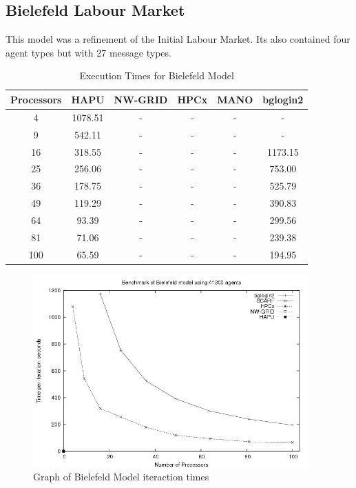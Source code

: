 \subsection{Bielefeld Labour Market}
This model was a refinement of the Initial Labour Market. Its also contained four agent types but with 27 message types.
{
\renewcommand{\arraystretch}{1.25}
\begin{table}[ht]
 \centering
  \begin{tabular}{c|ccccc}
 Processors &HAPU  &NW-GRID &HPCx  &MANO   &bglogin2 \\ \hline
 4   &1078.51  &-   &-   &-   &-   \\
 9   &542.11   &-   &-   &-   &-   \\
 16   &318.55   &-   &-   &-   &1173.15  \\
 25   &256.06   &-   &-   &-   &753.00   \\
 36   &178.75   &-   &-   &-   &525.79   \\
 49   &119.29   &-   &-   &-   &390.83   \\
 64   &93.39  &-   &-   &-   &299.56   \\
 81   &71.06   &-   &-   &-   &239.38   \\
 100   &65.59   &-   &-   &-   &194.95   \\
 \end{tabular}
 \caption{Execution Times for Bielefeld Model}
 \label{tab:ExecutionTimesForBielefeld}
\end{table}
}
\bigskip
\begin{figure}[ht]
 \centering
  \includegraphics[width=300pt]{Bielefeld2-graph.jpg}
 \caption{Graph of Bielefeld Model iteraction times}
 \label{fig:Labour-graph}
\end{figure}

